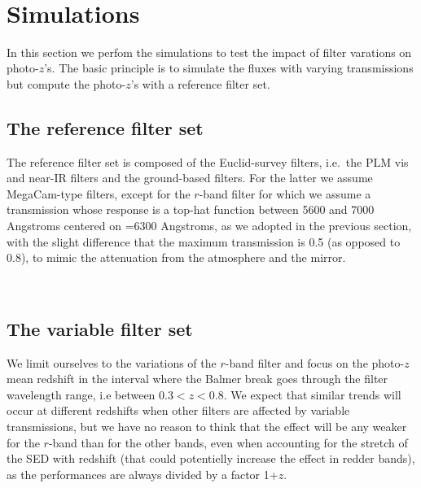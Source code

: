 \documentclass{article}
\begin{document}
    \begin{center}
    \end{center}
    { \hspace*{\fill} \\}
    
    \hypertarget{simulations}{%
\section{Simulations}\label{simulations}}

In this section we perfom the simulations to test the impact of filter
varations on photo-\(z\)'s. The basic principle is to simulate the
fluxes with varying transmissions but compute the photo-\(z\)'s with a
reference filter set.

\hypertarget{the-reference-filter-set}{%
\subsection{The reference filter set}\label{the-reference-filter-set}}

The reference filter set is composed of the Euclid-survey filters,
i.e.~the PLM vis and near-IR filters and the ground-based filters. For
the latter we assume MegaCam-type filters, except for the \(r\)-band
filter for which we assume a transmission whose response is a top-hat
function between 5600 and 7000 Angstroms centered on =6300 Angstroms, as
we adopted in the previous section, with the slight difference that the
maximum transmission is 0.5 (as opposed to 0.8), to mimic the
attenuation from the atmosphere and the mirror.



    \begin{center}
    \end{center}
    { \hspace*{\fill} \\}
    
    \hypertarget{the-variable-filter-set}{%
\subsection{The variable filter set}\label{the-variable-filter-set}}

We limit ourselves to the variations of the \(r\)-band filter and focus
on the photo-\(z\) mean redshift in the interval where the Balmer break
goes through the filter wavelength range, i.e between \(0.3<z<0.8\). We
expect that similar trends will occur at different redshifts when other
filters are affected by variable transmissions, but we have no reason to
think that the effect will be any weaker for the \(r\)-band than for the
other bands, even when accounting for the stretch of the SED with
redshift (that could potentielly increase the effect in redder bands),
as the performances are always divided by a factor 1+\(z\).
\end{document}

